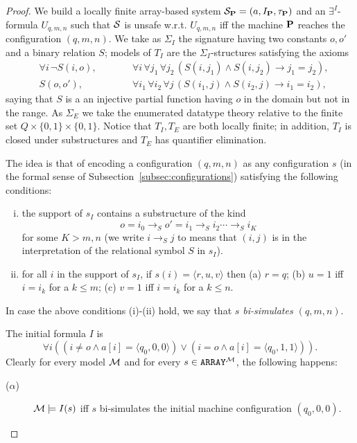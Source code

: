 \documentclass{LMCS}
\newcommand{\cM}{\ensuremath \mathcal M}
\newcommand{\cSi}{\ensuremath \mathcal S}
\theoremstyle{plain}\newtheorem{assumption}[thm]{Assumption}
\theoremstyle{plain}\newtheorem{proposition}[thm]{Proposition}
\theoremstyle{plain}\newtheorem{property}[thm]{Property}
\theoremstyle{plain}\newtheorem{example}[thm]{Example}
\theoremstyle{plain}\newtheorem{claim}[thm]{Claim}
\theoremstyle{plain}\newtheorem{lemma}[thm]{Lemma}
\begin{document}
\begin{proof}
We build a locally finite array-based system $\cSi_{\bf P}=(a, I_{\bf
  P}, \tau_{\bf P})$ and an $\exists^I$-formula $U_{q,m,n}$ such that
$\cSi$ is unsafe w.r.t. $U_{q,m,n}$ iff the machine $\bf P$ reaches
the configuration $(q, m, n)$.  We take as $\Sigma_I$ the signature
having two constants $o, o'$ and a binary relation $S$; models of
$T_I$ are the $\Sigma_I$-structures satisfying the axioms
\begin{eqnarray*}
  &\forall i \,\neg S(i,o),~~~~~~~~~~~~~ &
  \forall i\,\forall j_1\,\forall j_2\,(S(i,j_1)\wedge S(i,j_2)\to j_1=j_2),
  \\
  &S(o,o'),~~~~~~~~~~~~~~~~~&
  \forall i_1\,\forall i_2\,\forall j\,(S(i_1,j)\wedge S(i_2,j)\to i_1=i_2),
\end{eqnarray*}
saying that $S$ is a an injective partial function having $o$ in the
domain but not in the range.  As $\Sigma_E$ we take the enumerated
datatype theory relative to the finite set $Q\times\{0,1\}\times\{0,
1\}$.  Notice that $T_I, T_E$ are both locally finite; in addition,
$T_I$ is closed under substructures and $T_E$ has quantifier
elimination.

The idea is that of encoding a configuration $(q,m,n)$ as any
configuration $s$ (in the formal sense of Subsection~\ref{subsec:configurations}) satisfying the following
conditions:
\begin{enumerate}[(i)]
 \item the support of $s_I$ contains a substructure of the kind
   $$
   o=i_0\to_S o'=i_1\to_S i_2\cdots \to_S i_K
   $$
   for some $K> m,n$ (we write $i \to_S j$ to means that $(i,j)$ is in
   the interpretation of the relational symbol $S$ in $s_I$).
 \item for all $i$ in the support of $s_I$, if
   $s(i)=\langle r, u,v\rangle$ then (a) $r=q$; (b) $u=1$ iff $i=i_k$
   for  a $k\leq m$; (c) $v=1$ iff $i=i_k$ for a $k\leq n$.
\end{enumerate}
In case the above conditions (i)-(ii) hold, we say that \emph{$s$
  bi-simulates $(q, m,n)$}.

The initial formula $I$ is $$\forall i ((i\not = o\wedge a[i]=\langle
q_0, 0, 0\rangle) \vee (i=o \wedge a[i]=\langle q_0, 1, 1\rangle)).$$
Clearly for every model $\cM$ and for every $s\in
\mathtt{ARRAY}^{\cM}$, the following happens:
\begin{description}
\item[{\rm ($\alpha$)}] $\cM\models I(s)$ iff $s$ bi-simulates the
  initial machine configuration $(q_0,0,0)$.
\end{description}


\end{proof}
\end{document}
